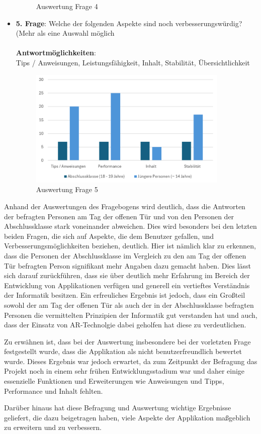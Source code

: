 \begin{itemize}
\begin{figure}[H]
        \caption{Auswertung Frage 4}
        \label{fig:fr1}
    \end{figure}
    \item \textbf{5. Frage}: Welche der folgenden Aspekte sind noch verbesserungswürdig? (Mehr als eine Auswahl möglich
    \\
    \\
    \textbf{Antwortmöglichkeiten}:\\
    Tips / Anweisungen, Leistungsfähigkeit, Inhalt, Stabilität, Übersichtlichkeit
    \\
    \begin{figure}[H]
        \centering
        \includegraphics[width=0.9\textwidth]{images/AuswertungFrage5}
        \caption{Auswertung Frage 5}
        \label{fig:fr1}
    \end{figure}
\end{itemize}

Anhand der Auswertungen des Fragebogens wird deutlich, dass die Antworten der befragten Personen am Tag der offenen Tür
und von den Personen der Abschlussklasse stark voneinander abweichen. Dies wird besonders bei den letzten beiden Fragen,
die sich auf Aspekte, die dem Benutzer gefallen, und Verbesserungsmöglichkeiten beziehen, deutlich. Hier ist nämlich klar
zu erkennen, dass die Personen der Abschlussklasse im Vergleich zu den am Tag der offenen Tür befragten Person signifikant
mehr Angaben dazu gemacht haben. Dies lässt sich darauf zurückführen, dass sie über deutlich mehr Erfahrung im Bereich
der Entwicklung von Applikationen verfügen und generell ein vertieftes Verständnis der Informatik besitzen. Ein erfreuliches
Ergebnis ist jedoch, dass ein Großteil sowohl der am Tag der offenen Tür als auch der in der Abschlussklasse
befragten Personen die vermittelten Prinzipien der Informatik gut verstanden hat und auch, dass der Einsatz von AR-Technolgie
dabei geholfen hat diese zu verdeutlichen.

Zu erwähnen ist, dass bei der Auswertung insbesondere bei der vorletzten Frage festgestellt wurde, dass die Applikation
als nicht benutzerfreundlich bewertet wurde. Dieses Ergebnis war jedoch erwartet, da zum Zeitpunkt der Befragung das
Projekt noch in einem sehr frühen Entwicklungsstadium war und daher einige essenzielle Funktionen und Erweiterungen wie
Anweisungen und Tipps, Performance und Inhalt fehlten.

Darüber hinaus hat diese Befragung und Auswertung wichtige Ergebnisse geliefert, die dazu beigetragen haben, viele Aspekte
der Applikation maßgeblich zu erweitern und zu verbessern.
